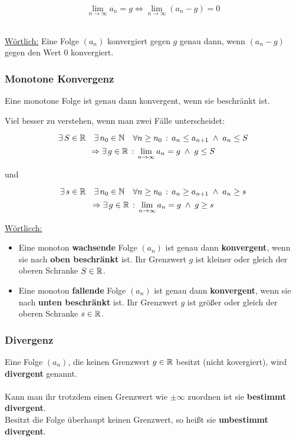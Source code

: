\begin{Theorem}

$$\lim\limits_{n\to\infty}a_n=g\Leftrightarrow \lim\limits_{n\to\infty}(a_n-g)=0$$
\end{Theorem}
\\
\underline{Wörtlich:} Eine Folge $(a_n)$ konvergiert gegen $g$ genau dann, wenn $(a_n-g)$ gegen den Wert $0$ konvergiert.
\subsubsection{Monotone Konvergenz}


\begin{Theorem}
Eine monotone Folge ist genau dann konvergent, wenn sie beschränkt ist.
\end{Theorem}

\begin{Beweis}
\end{Beweis}

Viel besser zu verstehen, wenn man zwei Fälle unterscheidet:

\begin{Theorem}
$$\exists\, S\in\mathbb{R} \quad \exists \,n_0\in\mathbb{N} \quad \forall n\geq n_0\,:\, a_n\leq a_{n+1}\; \land \; a_n\leq S$$
$$\Rightarrow \exists\, g\in\mathbb{R} \,:\, \lim\limits_{n\to\infty}a_n=g\;\land\; g\leq S $$
 \begin{center}und\end{center}
$$\exists \, s\in\mathbb{R} \quad\exists \, n_0\in\mathbb{N} \quad \forall n\geq n_0\,:\, a_n\geq a_{n+1}\; \land \;a_n\geq s$$
$$\Rightarrow \exists \, g\in\mathbb{R} \,:\, \lim\limits_{n\to\infty}a_n=g\;\land\; g\geq s$$
\end{Theorem}

	\underline{Wörtlicch:}
\begin{itemize}
\item Eine monoton \textbf{wachsende} Folge $(a_n)$ ist genau dann \textbf{konvergent}, wenn sie nach \textbf{oben beschränkt} ist. Ihr Grenzwert $g$ ist kleiner oder gleich der oberen Schranke $S\in\mathbb{R}$.
\item  Eine monoton \textbf{fallende} Folge $(a_n)$ ist genau dann \textbf{konvergent}, wenn sie nach \textbf{unten beschränkt} ist. Ihr Grenzwert $g$ ist größer oder gleich der oberen Schranke $s\in\mathbb{R}$.
\end{itemize}

\subsubsection{Divergenz}
\begin{Definition}
Eine Folge $(a_n)$, die keinen Grenzwert $g\in\mathbb{R}$ besitzt (nicht kovergiert), wird \textbf{divergent} genannt.\\\\
Kann man ihr trotzdem einen Grenzwert wie $\pm\infty$ zuordnen ist sie \textbf{bestimmt divergent}.\\
Besitzt die Folge überhaupt keinen Grenzwert, so heißt sie \textbf{unbestimmt divergent}.
\end{Definition}

